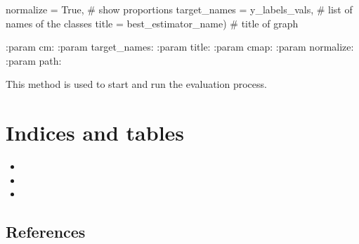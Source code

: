 \documentclass[letterpaper,10pt,english,openany,oneside]{sphinxmanual}
\begin{document}
\begin{fulllineitems}
\begin{fulllineitems}
\begin{description}
normalize    = True,                \# show proportions
target\_names = y\_labels\_vals,       \# list of names of the classes
title        = best\_estimator\_name) \# title of graph

\end{description}

:param cm:
:param target\_names:
:param title:
:param cmap:
:param normalize:
:param path:

\end{fulllineitems}


\begin{fulllineitems}
\label{\detokenize{Evaluation:cmc.Evaluation.Evaluation.run_evaluation}}
This method is used to start and run the evaluation process.

\end{fulllineitems}


\end{fulllineitems}



\chapter{Indices and tables}
\label{\detokenize{index:indices-and-tables}}\begin{itemize}
\item {} 

\item {} 

\item {} 

\end{itemize}


\section{References}
\label{\detokenize{index:references}}


\renewcommand{\indexname}{Index}
\printindex
\end{document}
